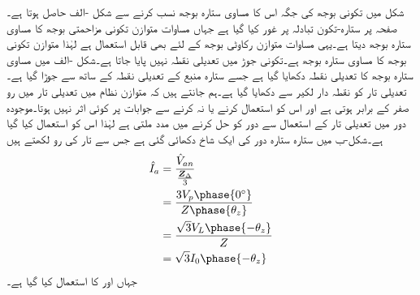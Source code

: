 شکل  میں تکونی بوجھ کی جگہ اس کا مساوی ستارہ بوجھ نسب کرنے سے شکل -الف  حاصل ہوتا ہے۔صفحہ  پر ستارہ-تکون تبادلہ پر غور کیا گیا ہے جہاں مساوات  متوازن تکونی مزاحمتی بوجھ کا مساوی ستارہ بوجھ دیتا ہے۔یہی مساوات متوازن رکاوٹی بوجھ کے لئے بھی قابل استعمال ہے لہٰذا متوازن تکونی بوجھ کا مساوی ستارہ بوجھ  ہے۔تکونی جوڑ میں تعدیلی نقطہ  نہیں پایا جاتا ہے۔شکل -الف میں مساوی ستارہ بوجھ کا تعدیلی نقطہ  دکھایا گیا ہے جسے ستارہ منبع کے تعدیلی نقطہ  کے ساتھ سے جوڑا گیا ہے۔تعدیلی تار کو نقطہ دار لکیر سے دکھایا گیا ہے۔ہم جانتے ہیں کہ متوازن نظام میں تعدیلی تار میں رو صفر کے برابر ہوتی ہے اور اس کو استعمال کرنے یا نہ کرنے سے جوابات پر کوئی اثر نہیں ہوتا۔موجودہ دور میں تعدیلی تار کے استعمال سے دور کو حل کرنے میں مدد ملتی ہے لہٰذا اس کو استعمال کیا گیا ہے۔شکل-ب میں ستارہ ستارہ دور کی ایک شاخ دکھائی گئی ہے جس سے تار کی رو لکھتے ہیں
\begin{align*}
\hat{I}_a&=\frac{\hat{V}_{an}}{\frac{\bZ_{\Delta}}{3}}\\
&=\frac{3V_p\phase{0^{\circ}}}{Z\phase{\theta_z}}\\
&=\frac{\sqrt{3}V_L\phase{-\theta_z}}{Z}\\
&=\sqrt{3}I_0\phase{-\theta_z}
\end{align*}
جہاں  اور  کا استعمال کیا گیا ہے۔

